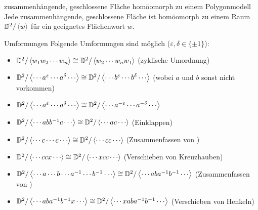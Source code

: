 \linie

\begin{Lemma}{zusammenhängende, geschlossene Fläche homöomorph
              zu einem Polygonmodell}\\
    Jede zusammenhängende, geschlossene Fläche ist homöomorph zu einem Raum
    $\mathbb{D}^2 / \left\langle{w}\right\rangle$ für ein geeignetes Flächenwort $w$.
\end{Lemma}

\begin{Lemma}{Umformungen}
    Folgende Umformungen sind möglich ($\varepsilon, \delta \in \{\pm 1\}$):
    \begin{itemize}
        \item
        $\mathbb{D}^2 / \left\langle{w_1 w_2 \dotsb w_n}\right\rangle \cong
        \mathbb{D}^2 / \left\langle{w_2 \dotsb w_n w_1}\right\rangle$
        (zyklische Umordnung)

        \item
        $\mathbb{D}^2 / \left\langle{\dotsb a^\varepsilon \dotsb
        a^\delta \dotsb}\right\rangle \cong
        \mathbb{D}^2 / \left\langle{\dotsb b^\varepsilon \dotsb
        b^\delta \dotsb}\right\rangle$
        (wobei $a$ und $b$ sonst nicht vorkommen)

        \item
        $\mathbb{D}^2 / \left\langle{\dotsb a^\varepsilon \dotsb
        a^\delta \dotsb}\right\rangle \cong
        \mathbb{D}^2 / \left\langle{\dotsb a^{-\varepsilon} \dotsb
        a^{-\delta} \dotsb}\right\rangle$

        \item
        $\mathbb{D}^2 / \left\langle{\dotsb a b b^{-1} c \dotsb}\right\rangle \cong
        \mathbb{D}^2 / \left\langle{\dotsb a c \dotsb}\right\rangle$
        (Einklappen)

        \item
        $\mathbb{D}^2 / \left\langle{\dotsb c \dotsb c \dotsb}\right\rangle \cong
        \mathbb{D}^2 / \left\langle{\dotsb c c \dotsb}\right\rangle$
        (Zusammenfassen von )

        \item
        $\mathbb{D}^2 / \left\langle{\dotsb c c x \dotsb}\right\rangle \cong
        \mathbb{D}^2 / \left\langle{\dotsb x c c \dotsb}\right\rangle$
        (Verschieben von Kreuzhauben)

        \item
        $\mathbb{D}^2 / \left\langle{\dotsb a \dotsb b \dotsb a^{-1}
        \dotsb b^{-1} \dotsb}\right\rangle \cong
        \mathbb{D}^2 / \left\langle{\dotsb a b a^{-1} b^{-1} \dotsb}\right\rangle$
        (Zusammenfassen von )

        \item
        $\mathbb{D}^2 / \left\langle{\dotsb a b a^{-1} b^{-1} x \dotsb}\right\rangle \cong
        \mathbb{D}^2 / \left\langle{\dotsb x a b a^{-1} b^{-1} \dotsb}\right\rangle$
        (Verschieben von Henkeln)
    \end{itemize}
\end{Lemma}

